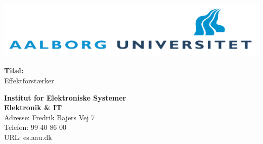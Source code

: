 \begin{multicols}{2}
\includegraphics[scale=0.35]{forside/aau.png}

\small{\textbf{Titel:\\}
Effektforstærker}

\scriptsize{\textbf{Institut for Elektroniske Systemer\\ Elektronik \& IT\\}
Adresse: Fredrik Bajers Vej 7\\
Telefon: 99 40 86 00\\
URL: es.aau.dk \\}
\end{multicols}
